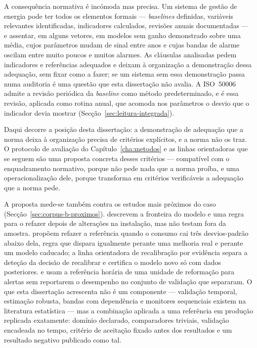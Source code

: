 A consequência normativa é incómoda mas precisa. Um sistema de gestão de
energia pode ter todos os elementos formais --- \emph{baselines} definidas,
variáveis relevantes identificadas, indicadores calculados, revisões
anuais documentadas --- e assentar, em alguns vetores, em modelos sem ganho
demonstrado sobre uma média, cujos parâmetros mudam de sinal entre anos e
cujas bandas de alarme oscilam entre muito poucos e muitos alarmes. As
cláusulas analisadas pedem indicadores e referências adequados e deixam à
organização a demonstração dessa adequação, sem fixar como a fazer; se um
sistema sem essa demonstração passa numa auditoria é uma questão que esta
dissertação não avalia. A ISO~50006 admite a revisão periódica da
\emph{baseline} como método predeterminado, e é essa revisão, aplicada
como rotina anual, que acomoda nos parâmetros o desvio que o indicador
devia mostrar (Secção~\ref{sec:leitura-integrada}).

Daqui decorre a posição desta dissertação: a demonstração de adequação que
a norma deixa à organização precisa de critérios explícitos, e a norma não
os traz. O protocolo de avaliação do Capítulo~\ref{cha:metodos} e as linhas
orientadoras que se seguem são uma proposta concreta desses critérios ---
compatível com o enquadramento normativo, porque não pede nada que a norma
proíba, e uma operacionalização dele, porque transforma em critérios
verificáveis a adequação que a norma pede.

A proposta mede-se também contra os estudos mais próximos do caso
(Secção~\ref{sec:corpus-b-proximos}). \textcite{Beisheim2019} descrevem a
fronteira do modelo e uma regra para o refazer depois de alterações na
instalação, mas não testam fora da amostra. \textcite{Yao2016} propõem
refazer a referência quando o consumo cai três desvios-padrão abaixo dela,
regra que dispara igualmente perante uma melhoria real e perante um modelo
caducado; a linha orientadora de recalibração por evidência separa a
deteção da decisão de recalibrar e certifica o modelo novo só com dados
posteriores.  e
\textcite{Velazquez2013} usam a referência horária de uma unidade de
reformação para alertas sem reportarem o desempenho no conjunto de
validação que separaram. O que esta dissertação acrescenta não é um
componente --- validação temporal, estimação robusta, bandas com dependência
e monitores sequenciais existem na literatura estatística --- mas a
combinação aplicada a uma referência em produção replicada exatamente:
domínio declarado, comparadores triviais, validação encadeada no tempo,
critério de aceitação fixado antes dos resultados e um resultado negativo
publicado como tal.

